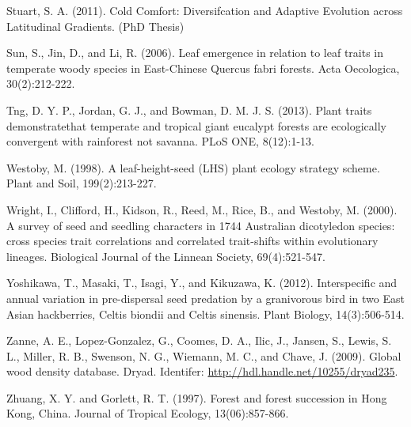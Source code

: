 \documentclass[openright,12pt,a4paper]{memoir}
\begin{document}
Stuart, S. A. (2011). Cold Comfort: Diversifcation and Adaptive Evolution across Latitudinal Gradients. (PhD Thesis)

Sun, S., Jin, D., and Li, R. (2006). Leaf emergence in relation to leaf traits in temperate woody species in East-Chinese Quercus fabri forests. Acta Oecologica, 30(2):212-222.

Tng, D. Y. P., Jordan, G. J., and Bowman, D. M. J. S. (2013). Plant traits demonstratethat temperate and tropical giant eucalypt forests are ecologically convergent with rainforest not savanna. PLoS ONE, 8(12):1-13.

Westoby, M. (1998). A leaf-height-seed (LHS) plant ecology strategy scheme. Plant and Soil, 199(2):213-227.

Wright, I., Clifford, H., Kidson, R., Reed, M., Rice, B., and Westoby, M. (2000). A survey of seed and seedling characters in 1744 Australian dicotyledon species: cross species trait correlations and correlated trait-shifts within evolutionary lineages. Biological Journal of the Linnean Society, 69(4):521-547.

Yoshikawa, T., Masaki, T., Isagi, Y., and Kikuzawa, K. (2012). Interspecific and annual variation in pre-dispersal seed predation by a granivorous bird in two East Asian hackberries, Celtis biondii and Celtis sinensis. Plant Biology, 14(3):506-514.

Zanne, A. E., Lopez-Gonzalez, G., Coomes, D. A., Ilic, J., Jansen, S., Lewis, S. L., Miller, R. B., Swenson, N. G., Wiemann, M. C., and Chave, J. (2009). Global wood density database. Dryad. Identifer: \url{http://hdl.handle.net/10255/dryad235}.

Zhuang, X. Y. and Gorlett, R. T. (1997). Forest and forest succession in Hong Kong, China. Journal of Tropical Ecology, 13(06):857-866.
\end{document}
